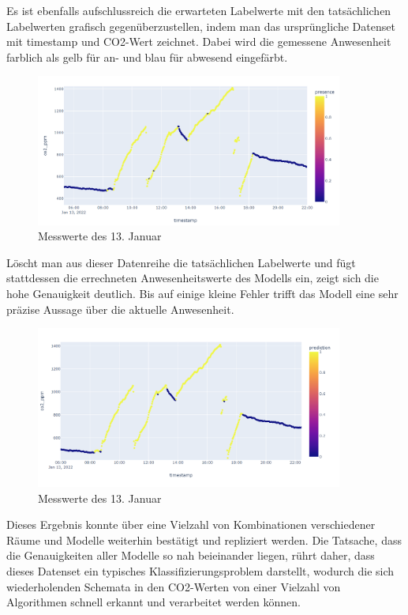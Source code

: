 \newpage
Es ist ebenfalls aufschlussreich die erwarteten Labelwerte mit den tatsächlichen Labelwerten grafisch gegenüberzustellen, 
indem man das ursprüngliche Datenset mit timestamp und CO2-Wert zeichnet. Dabei wird die gemessene Anwesenheit 
farblich als gelb für an- und blau für abwesend eingefärbt.

\begin{figure}[h]
    \centering
    \includegraphics[width=0.9\textwidth]{pic/nov23_actual.png}
    \caption{Messwerte des 13. Januar}
    \label{fig:ConMatrix}
\end{figure}

Löscht man aus dieser Datenreihe die tatsächlichen Labelwerte und fügt stattdessen die errechneten 
Anwesenheitswerte des Modells ein, zeigt sich die hohe Genauigkeit deutlich. Bis auf einige kleine Fehler
trifft das Modell eine sehr präzise Aussage über die aktuelle Anwesenheit.

\begin{figure}[h]
    \centering
    \includegraphics[width=0.9\textwidth]{pic/nov23_predicted.png}
    \caption{Messwerte des 13. Januar}
    \label{fig:ConMatrix}
\end{figure}

Dieses Ergebnis konnte über eine Vielzahl von Kombinationen verschiedener Räume und Modelle weiterhin
bestätigt und repliziert werden. Die Tatsache, dass die Genauigkeiten aller Modelle so nah beieinander 
liegen, rührt daher, dass dieses Datenset ein typisches Klassifizierungsproblem darstellt,
wodurch die sich wiederholenden Schemata in den CO2-Werten von einer Vielzahl von Algorithmen schnell 
erkannt und verarbeitet werden können.

